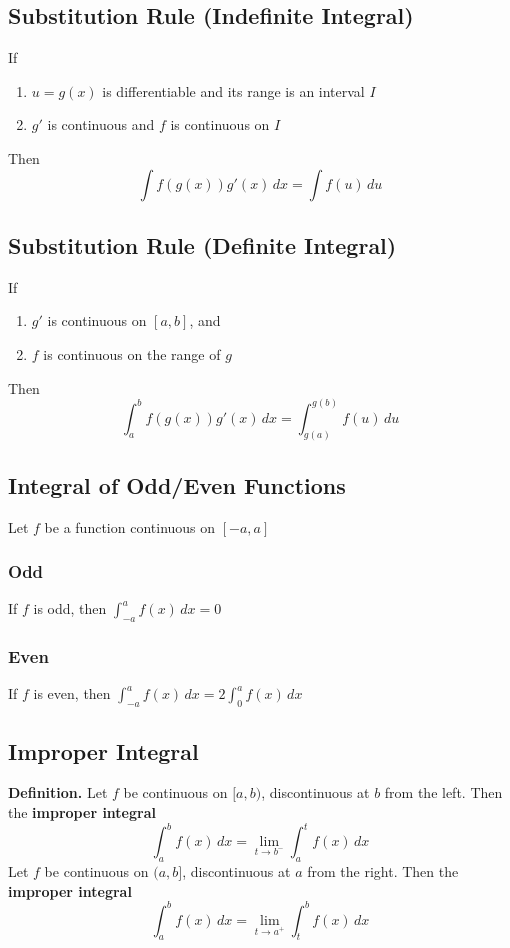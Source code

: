 \documentclass[../ma2002_notes.tex]{subfiles}
\begin{document}
\subsection{Substitution Rule (Indefinite Integral)}
If
\begin{enumerate}
	\item\(u=g(x)\) is differentiable and its range is an interval \(I\)
	\item\(g'\) is continuous and \(f\) is continuous on \(I\)
\end{enumerate}
Then
\[\int f(g(x))g'(x)\,dx=\int f(u)\,du\]

\subsection{Substitution Rule (Definite Integral)}
If
\begin{enumerate}
	\item\(g'\) is continuous on \([a,b]\), and
	\item\(f\) is continuous on the range of \(g\)
\end{enumerate}
Then
\[\int_a^bf(g(x))g'(x)\,dx=\int_{g(a)}^{g(b)}f(u)\,du\]

\subsection{Integral of Odd/Even Functions}
Let \(f\) be a function continuous on \([-a,a]\)

\subsubsection{Odd}
If \(f\) is odd, then \(\int_{-a}^af(x)\,dx=0\)

\subsubsection{Even}
If \(f\) is even, then \(\int_{-a}^af(x)\,dx=2\int_0^af(x)\,dx\)

\subsection{Improper Integral}
\textbf{Definition.} Let \(f\) be continuous on \([a,b)\), discontinuous at \(b\) from the left. Then the \textbf{improper integral}
\[\int_a^bf(x)\,dx=\lim_{t\to b^-}\int_a^tf(x)\,dx\]
Let \(f\) be continuous on \((a,b]\), discontinuous at \(a\) from the right. Then the \textbf{improper integral}
\[\int_a^bf(x)\,dx=\lim_{t\to a^+}\int_t^bf(x)\,dx\]
\end{document}
